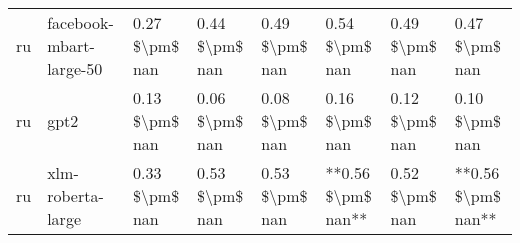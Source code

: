 \begin{tabular}{llllllll}
      ru &            facebook-mbart-large-50 & 0.27 \$\textbackslash pm\$ nan &            0.44 \$\textbackslash pm\$ nan &        0.49 \$\textbackslash pm\$ nan &         0.54 \$\textbackslash pm\$ nan &                          0.49 \$\textbackslash pm\$ nan &     0.47 \$\textbackslash pm\$ nan \\
      ru &                               gpt2 & 0.13 \$\textbackslash pm\$ nan &            0.06 \$\textbackslash pm\$ nan &        0.08 \$\textbackslash pm\$ nan &         0.16 \$\textbackslash pm\$ nan &                          0.12 \$\textbackslash pm\$ nan &     0.10 \$\textbackslash pm\$ nan \\
      ru &                  xlm-roberta-large & 0.33 \$\textbackslash pm\$ nan &            0.53 \$\textbackslash pm\$ nan &        0.53 \$\textbackslash pm\$ nan &     **0.56 \$\textbackslash pm\$ nan** &                          0.52 \$\textbackslash pm\$ nan & **0.56 \$\textbackslash pm\$ nan** \\
\bottomrule
\end{tabular}
